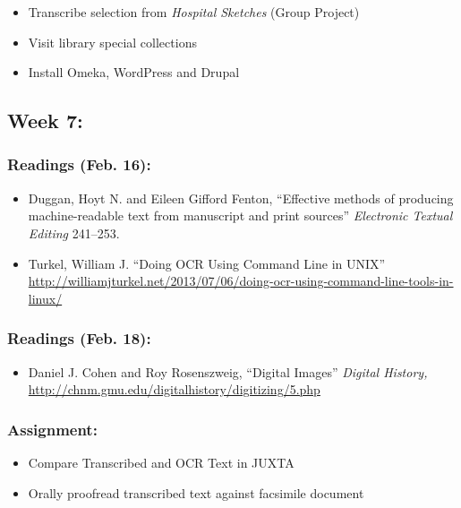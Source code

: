 \documentclass[]{article}
\begin{document}
\begin{itemize}
\itemsep1pt\parskip0pt
\item
  Transcribe selection from \emph{Hospital Sketches} (Group Project)
\item
  Visit library special collections
\item
  Install Omeka, WordPress and Drupal
\end{itemize}

\subsection{Week 7:}\label{week-7}

\subsubsection{Readings (Feb. 16):}\label{readings-feb.-16}

\begin{itemize}
\itemsep1pt\parskip0pt
\item
  Duggan, Hoyt N. and Eileen Gifford Fenton, ``Effective methods of
  producing machine-readable text from manuscript and print sources''
  \emph{Electronic Textual Editing} 241--253.
\item
  Turkel, William J. ``Doing OCR Using Command Line in UNIX''
  \url{http://williamjturkel.net/2013/07/06/doing-ocr-using-command-line-tools-in-linux/}
\end{itemize}

\subsubsection{Readings (Feb. 18):}\label{readings-feb.-18}

\begin{itemize}
\itemsep1pt\parskip0pt
\item
  Daniel J. Cohen and Roy Rosenszweig, ``Digital Images'' \emph{Digital
  History,} \url{http://chnm.gmu.edu/digitalhistory/digitizing/5.php}
\end{itemize}

\subsubsection{Assignment:}\label{assignment-5}

\begin{itemize}
\itemsep1pt\parskip0pt
\item
  Compare Transcribed and OCR Text in JUXTA\\
\item
  Orally proofread transcribed text against facsimile document
\end{itemize}
\end{document}
